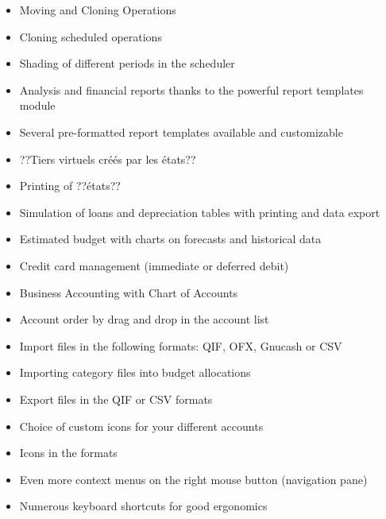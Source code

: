 \begin{itemize}
\item Moving and Cloning Operations

\item Cloning scheduled operations

\item Shading of different periods in the scheduler

\item Analysis and financial reports thanks to the powerful report templates module


\item Several pre-formatted report templates available and customizable

\item ??Tiers virtuels créés par les états??

\item Printing of  ??états??

\item Simulation of loans and depreciation tables with printing and data export

\item Estimated budget with charts on forecasts and historical data

\item Credit card management (immediate or deferred debit)

\item Business Accounting with Chart of Accounts

\item Account order by drag and drop in the account list

\item Import files in the following formats: \gls{QIF}, \gls{OFX}, \gls{Gnucash} or \gls{CSV}

\item Importing category files into budget allocations

\item Export files in the \gls{QIF} or \gls{CSV} formats

\item Choice of custom icons for your different accounts

\item Icons in the   formats

\item Even more context menus on the right mouse button (navigation pane)

\item Numerous keyboard shortcuts for good ergonomics

\end{itemize}

